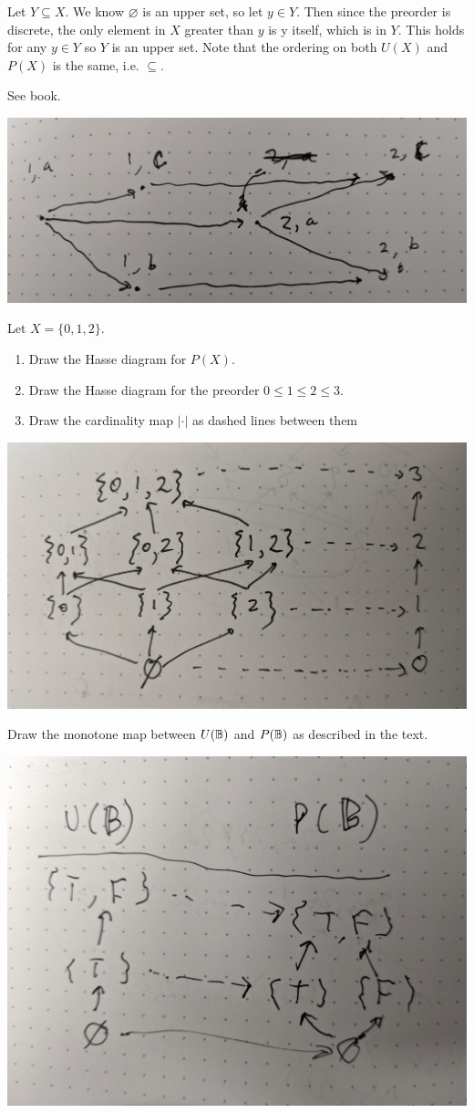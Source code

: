 Let $Y\subseteq X$.  We know $\varnothing$ is an upper set, so let $y\in Y$. Then since the preorder is discrete, the only element in $X$ greater than $y$ is y itself, which is in $Y$.  This holds for any $y\in Y$ so $Y$ is an upper set.  Note that the ordering on both $U(X)$ and $P(X)$ is the same, i.e. $\subseteq$.

See book.

\solution
\includegraphics[width=0.5\linewidth]{images/1-57.jpg}

Let $X = \{0, 1, 2\}$.
\begin{enumerate}
    \item Draw the Hasse diagram for $P(X)$.
    \item Draw the Hasse diagram for the preorder $0 \leq 1 \leq 2 \leq 3$.
    \item Draw the cardinality map $|\cdot|$ as dashed lines between them
\end{enumerate}

\solution
\includegraphics[width=0.5\linewidth]{images/1-63.jpg}

Draw the monotone map between $U(\mathbb{B})$ and $P(\mathbb{B})$ as described in the text.

\solution
\includegraphics[width=0.5\linewidth]{images/1-65.jpg}

